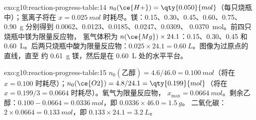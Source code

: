 \begin{solution}{exo:g10:reaction-progress-table:14}
$n_0(\ce{H+}) = \qty{0.050}{mol}$（每只烧瓶中）；氢离子将在
$x = \qty{0.025}{mol}$ 时耗尽。镁：0.15、0.30、0.45、0.60、0.75、
\qty{0.90}{g} 分别得到 0.0062、0.0123、0.0185、0.0247、0.0309、
\qty{0.0370}{mol}。前四只烧瓶中镁为限量反应物，
氢气体积为 $n(\ce{Mg}) \times 24.1$：0.15、0.30、0.45 和
\qty{0.60}{L}。后两只烧瓶中酸为限量反应物：$0.025 \times 24.1
= \qty{0.60}{L}$。图像为过原点的直线，直至
约 \qty{0.61}{g} 镁，然后是在
\qty{0.60}{L} 处的水平平台。
\end{solution}

\begin{solution}{exo:g10:reaction-progress-table:15}
$n_0(\text{乙醇}) = 4.6 / 46.0 = \qty{0.100}{mol}$（将在
$x = 0.100$ 时耗尽）；$n_0(\ce{O2}) = 4.8 / 24.1 = \qty{0.199}{mol}$（将在
$x = 0.199/3 = 0.0664$ 时耗尽）。氧气为限量反应物，
$x_{\max} = \qty{0.0664}{mol}$。剩余乙醇：$0.100 - 0.0664 =
\qty{0.0336}{mol}$，即 $0.0336 \times 46.0 = \qty{1.5}{g}$。
二氧化碳：$2 \times 0.0664 = \qty{0.133}{mol}$，即
$0.133 \times 24.1 = \qty{3.2}{L}$。
\end{solution}

